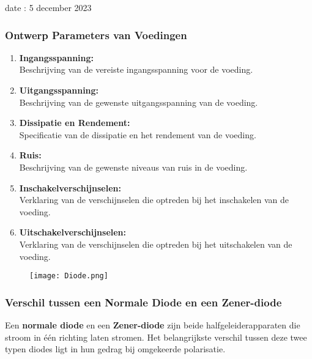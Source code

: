 date : 5 december 2023

\subsubsection*{Ontwerp Parameters van Voedingen}

\begin{enumerate}[label=--]
  \item \textbf{Ingangsspanning:} \\
    Beschrijving van de vereiste ingangsspanning voor de voeding.

  \item \textbf{Uitgangsspanning:} \\
    Beschrijving van de gewenste uitgangsspanning van de voeding.

  \item \textbf{Dissipatie en Rendement:} \\
    Specificatie van de dissipatie en het rendement van de voeding.

  \item \textbf{Ruis:} \\
    Beschrijving van de gewenste niveaus van ruis in de voeding.

  \item \textbf{Inschakelverschijnselen:} \\
    Verklaring van de verschijnselen die optreden bij het inschakelen van de voeding.

  \item \textbf{Uitschakelverschijnselen:} \\
    Verklaring van de verschijnselen die optreden bij het uitschakelen van de voeding.
\end{enumerate}

\begin{figure}[H]
\centering
\texttt{[image: Diode.png]}
\end{figure}

\subsubsection*{Verschil tussen een Normale Diode en een Zener-diode}

Een \textbf{normale diode} en een \textbf{Zener-diode} zijn beide halfgeleiderapparaten die stroom in één richting laten stromen. Het belangrijkste verschil tussen deze twee typen diodes ligt in hun gedrag bij omgekeerde polarisatie.\\

